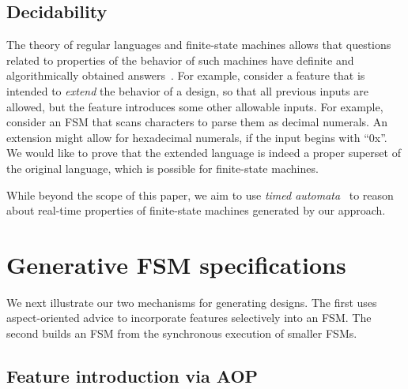 \documentclass[sigplan,anonymous,review]{acmart}
\begin{document}
\subsection{Decidability}\label{sec:decide}

The theory of regular languages and finite-state machines allows that questions related to properties of the behavior of such machines have definite and algorithmically obtained answers~\cite{sipser}. For example, consider a feature that is intended to \emph{extend} the behavior of a design, so that all previous inputs are allowed, but the feature introduces some other allowable inputs. For example, consider an FSM that scans characters to parse them as decimal numerals.  An extension might allow for hexadecimal numerals, if the input begins with ``0x''.  We would like to prove that the extended language is indeed a proper superset of the original language, which is possible for finite-state machines.

While beyond the scope of this paper, we aim to use \emph{timed automata}~\cite{10.1145/2518102} to reason about real-time properties of finite-state machines generated by our approach.

\section{Generative FSM specifications}

We next illustrate our two mechanisms for generating designs.  The first uses aspect-oriented advice to incorporate features selectively into an FSM.  The second builds an FSM from the synchronous execution of smaller FSMs.

\subsection{Feature introduction via AOP}\label{sec:vend}
\end{document}
